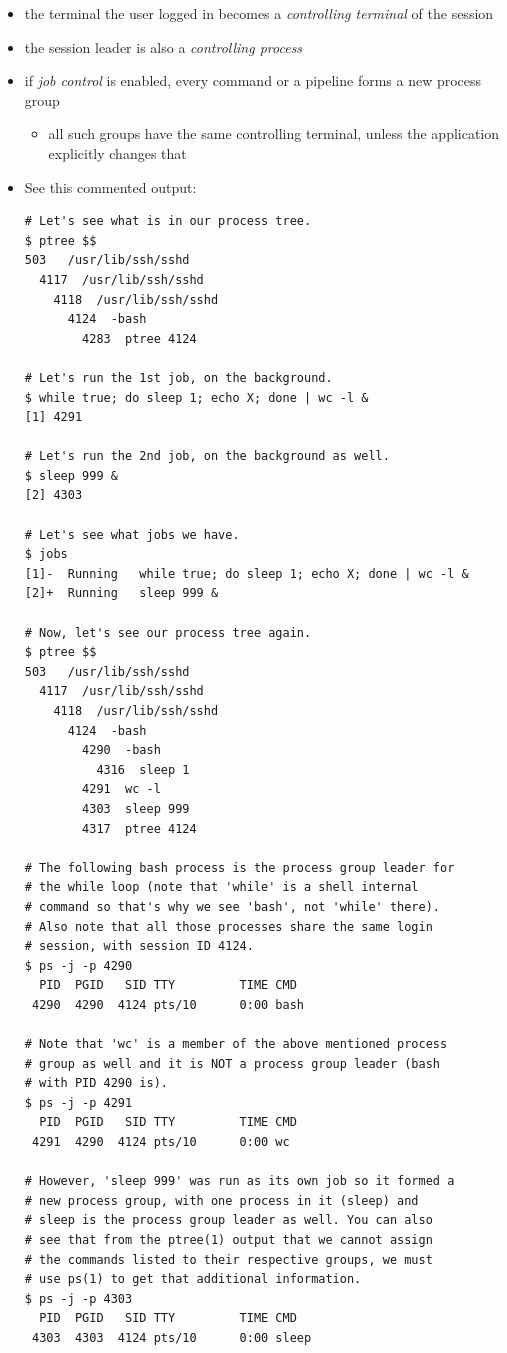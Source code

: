 \begin{itemize}
\item the terminal the user logged in becomes a \emph{controlling terminal} of
the session
\item the session leader is also a \emph{controlling process}
\item if \emph{job control} is enabled, every command or a pipeline forms a new
process group
\begin{itemize}
	\item all such groups have the same controlling terminal, unless the
	application explicitly changes that
\end{itemize}
\end{itemize}

\begin{itemize}
\item See this commented output:
\begin{verbatim}
# Let's see what is in our process tree.
$ ptree $$
503   /usr/lib/ssh/sshd
  4117  /usr/lib/ssh/sshd
    4118  /usr/lib/ssh/sshd
      4124  -bash
        4283  ptree 4124

# Let's run the 1st job, on the background.
$ while true; do sleep 1; echo X; done | wc -l &
[1] 4291

# Let's run the 2nd job, on the background as well.
$ sleep 999 &
[2] 4303

# Let's see what jobs we have.
$ jobs
[1]-  Running   while true; do sleep 1; echo X; done | wc -l &
[2]+  Running   sleep 999 &

# Now, let's see our process tree again.
$ ptree $$
503   /usr/lib/ssh/sshd
  4117  /usr/lib/ssh/sshd
    4118  /usr/lib/ssh/sshd
      4124  -bash
        4290  -bash
          4316  sleep 1
        4291  wc -l
        4303  sleep 999
        4317  ptree 4124

# The following bash process is the process group leader for
# the while loop (note that 'while' is a shell internal
# command so that's why we see 'bash', not 'while' there).
# Also note that all those processes share the same login
# session, with session ID 4124.
$ ps -j -p 4290
  PID  PGID   SID TTY         TIME CMD
 4290  4290  4124 pts/10      0:00 bash

# Note that 'wc' is a member of the above mentioned process
# group as well and it is NOT a process group leader (bash
# with PID 4290 is).
$ ps -j -p 4291
  PID  PGID   SID TTY         TIME CMD
 4291  4290  4124 pts/10      0:00 wc

# However, 'sleep 999' was run as its own job so it formed a
# new process group, with one process in it (sleep) and
# sleep is the process group leader as well. You can also
# see that from the ptree(1) output that we cannot assign
# the commands listed to their respective groups, we must
# use ps(1) to get that additional information.
$ ps -j -p 4303
  PID  PGID   SID TTY         TIME CMD
 4303  4303  4124 pts/10      0:00 sleep
\end{verbatim}
\end{itemize}


